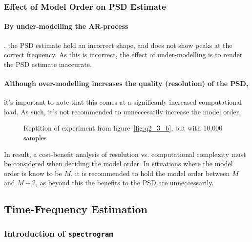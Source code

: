 \documentclass[main.tex]{subfiles}
\begin{document}
\subsubsection{Effect of Model Order on PSD Estimate}

\paragraph{By under-modelling the AR-process}, the PSD estimate hold an incorrect shape, and does not show peaks at the correct frequency. As this is incorrect, the effect of under-modelling is to render the PSD estimate inaccurate.

\paragraph{Although over-modelling increases the quality (resolution) of the PSD,} it's important to note that this comes at a significanly increased computational load. As such, it's not recommended to unneccesarily increase the model order.

\begin{figure}[H]
	\centering 
	\resizebox{\textwidth}{!}{}
	\caption{Reptition of experiment from figure~\ref{fig:q2_3_b}, but with 10,000 samples}
	\label{fig:q2_3_c}
\end{figure}


In result, a cost-benefit analysis of resolution vs. computational complexity must be considered when deciding the model order. In situations where the model order is know to be $M$, it is recommended to hold the model order between $M$ and $M+2$, as beyond this the benefits to the PSD are unneccessarily.






\subsection{Time-Frequency Estimation}

\subsubsection{Introduction of {\tt spectrogram}}
\end{document}
